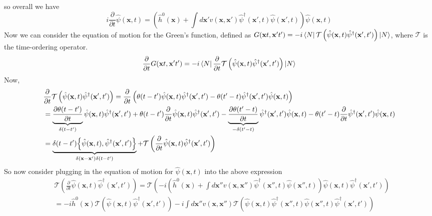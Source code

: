 so overall we have
\begin{equation}
  i\frac{\partial}{\partial t}\hat{\psi}(\mathbf{x}, t) = \left( \hat{h}^0(\mathbf{x}) + \int d\mathbf{x}' v(\mathbf{x},\mathbf{x}') \hat{\psi}^\dagger(\mathbf{x}', t) \hat{\psi}(\mathbf{x}', t) \right) \hat{\psi}(\mathbf{x}, t) 
\end{equation}
Now we can consider the equation of motion for the Green's function, defined as $G(\mathbf{x}t, \mathbf{x}'t') = -i \bra{N}\mathcal{T}\left(\hat{\psi}(\mathbf{x},t)\hat{\psi}^\dagger(\mathbf{x}',t')\right)\ket{N}$, where $\mathcal{T}$ is the time-ordering operator.
\begin{align}
  \frac{\partial}{\partial t}G(\mathbf{x}t, \mathbf{x}'t') &= -i \bra{N}\frac{\partial}{\partial t}\mathcal{T}\left(\hat{\psi}(\mathbf{x},t)\hat{\psi}^\dagger(\mathbf{x}',t')\right)\ket{N} \\
\end{align}
Now,
\begin{align}
  &\frac{\partial}{\partial t}\mathcal{T}\left(\hat{\psi}(\mathbf{x},t)\hat{\psi}^\dagger(\mathbf{x}',t')\right) = \frac{\partial}{\partial t}\left( \theta(t-t')\hat{\psi}(\mathbf{x},t)\hat{\psi}^\dagger(\mathbf{x}',t') - \theta(t'-t)\hat{\psi}^\dagger(\mathbf{x}',t')\hat{\psi}(\mathbf{x},t) \right) \\
  &= \underbrace{\frac{\partial \theta(t-t')}{\partial t}}_{\delta(t-t')}\hat{\psi}(\mathbf{x},t)\hat{\psi}^\dagger(\mathbf{x}',t') + \theta(t-t')\frac{\partial}{\partial t}\hat{\psi}(\mathbf{x},t)\hat{\psi}^\dagger(\mathbf{x}',t') - \underbrace{\frac{\partial \theta(t'-t)}{\partial t}}_{-\delta(t'-t)}\hat{\psi}^\dagger(\mathbf{x}',t')\hat{\psi}(\mathbf{x},t) - \theta(t'-t)\frac{\partial}{\partial t}\hat{\psi}^\dagger(\mathbf{x}',t')\hat{\psi}(\mathbf{x},t) \\
  &= \underbrace{\delta(t-t') {\acomm{\hat{\psi}(\mathbf{x},t)}{\hat{\psi}^\dagger(\mathbf{x}',t')}}}_{\delta(\mathbf{x}-\mathbf{x}') \delta(t-t')} + \mathcal{T}\left(\frac{\partial}{\partial t}\hat{\psi}(\mathbf{x},t)\hat{\psi}^\dagger(\mathbf{x}',t')\right) \\
\end{align}
So now consider plugging in the equation of motion for $\hat{\psi}(\mathbf{x},t)$ into the above expression
\begin{align}
  &\mathcal{T}\left(\frac{\partial}{\partial t}\hat{\psi}(\mathbf{x},t)\hat{\psi}^\dagger(\mathbf{x}',t')\right) = \mathcal{T}\left(-i \left( \hat{h}^0(\mathbf{x}) + \int d\mathbf{x}'' v(\mathbf{x},\mathbf{x}'') \hat{\psi}^\dagger(\mathbf{x}'',t) \hat{\psi}(\mathbf{x}'',t) \right) \hat{\psi}(\mathbf{x},t)\hat{\psi}^\dagger(\mathbf{x}',t')\right) \\
  &=  -i \hat{h}^0(\mathbf{x}) \mathcal{T}\left(\hat{\psi}(\mathbf{x},t)\hat{\psi}^\dagger(\mathbf{x}',t')\right) - i \int d\mathbf{x}'' v(\mathbf{x},\mathbf{x}'') \mathcal{T}\left(\hat{\psi}(\mathbf{x},t)\hat{\psi}^\dagger(\mathbf{x}'',t) \hat{\psi}(\mathbf{x}'',t) \hat{\psi}^\dagger(\mathbf{x}',t')\right)
\end{align}
